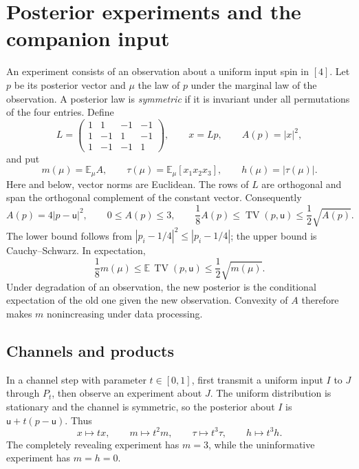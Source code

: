 \documentclass[11pt]{article}
\numberwithin{equation}{section}
\newcommand{\E}{\mathbb E}
\newcommand{\unif}{\mathsf u}
\newcommand{\TV}{\operatorname{TV}}
\begin{document}
\section{Posterior experiments and the companion input}
\label{sec:posteriors}

An experiment consists of an observation about a uniform input
spin in $[4]$. Let $p$ be its posterior vector and $\mu$ the law
of $p$ under the marginal law of the observation. A posterior law
is \emph{symmetric} if it is invariant under all permutations of
the four entries. Define
\[
 L=\begin{pmatrix}
 1&1&-1&-1\\
 1&-1&1&-1\\
 1&-1&-1&1
 \end{pmatrix},\qquad x=Lp,\qquad A(p)=|x|^2,
\]
and put
\begin{equation}\label{eq:statistics}
 m(\mu)=\E_\mu A,
 \qquad \tau(\mu)=\E_\mu[x_1x_2x_3],
 \qquad h(\mu)=|\tau(\mu)|.
\end{equation}
Here and below, vector norms are Euclidean. The rows of $L$ are
orthogonal and span the orthogonal complement of the constant
vector. Consequently
\begin{equation}\label{eq:posterior-bounds}
 A(p)=4|p-\unif|^2,\qquad 0\leq A(p)\leq3,
 \qquad \frac18A(p)\leq\TV(p,\unif)\leq\frac12\sqrt{A(p)}.
\end{equation}
The lower bound follows from $|p_i-1/4|^2\leq|p_i-1/4|$;
the upper bound is Cauchy--Schwarz. In expectation,
\begin{equation}\label{eq:expected-TV}
 \frac18m(\mu)\leq\E\,\TV(p,\unif)
       \leq\frac12\sqrt{m(\mu)}.
\end{equation}
Under degradation of an observation, the new posterior is the
conditional expectation of the old one given the new observation.
Convexity of $A$ therefore makes $m$ nonincreasing under data
processing.

\subsection{Channels and products}

In a channel step with parameter $t\in[0,1]$, first transmit a
uniform input $I$ to $J$ through $P_t$, then observe an experiment
about $J$. The uniform distribution is stationary and the channel
is symmetric, so the posterior about $I$ is
$\unif+t(p-\unif)$. Thus
\begin{equation}\label{eq:channel-scaling}
 x\longmapsto tx,\qquad m\longmapsto t^2m,
 \qquad \tau\longmapsto t^3\tau,
 \qquad h\longmapsto t^3h.
\end{equation}
The completely revealing experiment has $m=3$, while the
uninformative experiment has $m=h=0$.
\end{document}
